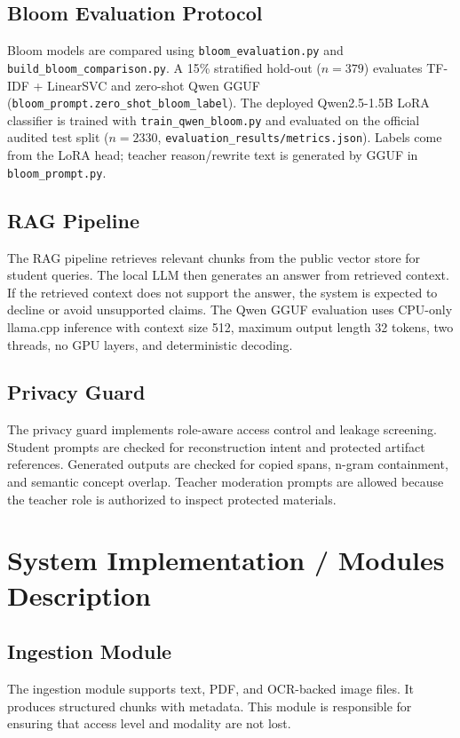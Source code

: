\subsection{Bloom Evaluation Protocol}
Bloom models are compared using \texttt{bloom\_evaluation.py} and \texttt{build\_bloom\_comparison.py}. A 15\% stratified hold-out ($n{=}379$) evaluates TF-IDF + LinearSVC and zero-shot Qwen GGUF (\texttt{bloom\_prompt.zero\_shot\_bloom\_label}). The deployed Qwen2.5-1.5B LoRA classifier is trained with \texttt{train\_qwen\_bloom.py} and evaluated on the official audited test split ($n{=}2330$, \texttt{evaluation\_results/metrics.json}). Labels come from the LoRA head; teacher reason/rewrite text is generated by GGUF in \texttt{bloom\_prompt.py}.

\subsection{RAG Pipeline}
The RAG pipeline retrieves relevant chunks from the public vector store for student queries. The local LLM then generates an answer from retrieved context. If the retrieved context does not support the answer, the system is expected to decline or avoid unsupported claims. The Qwen GGUF evaluation uses CPU-only llama.cpp inference with context size 512, maximum output length 32 tokens, two threads, no GPU layers, and deterministic decoding.

\subsection{Privacy Guard}
The privacy guard implements role-aware access control and leakage screening. Student prompts are checked for reconstruction intent and protected artifact references. Generated outputs are checked for copied spans, n-gram containment, and semantic concept overlap. Teacher moderation prompts are allowed because the teacher role is authorized to inspect protected materials.

\section{System Implementation / Modules Description}

\subsection{Ingestion Module}
The ingestion module supports text, PDF, and OCR-backed image files. It produces structured chunks with metadata. This module is responsible for ensuring that access level and modality are not lost.

